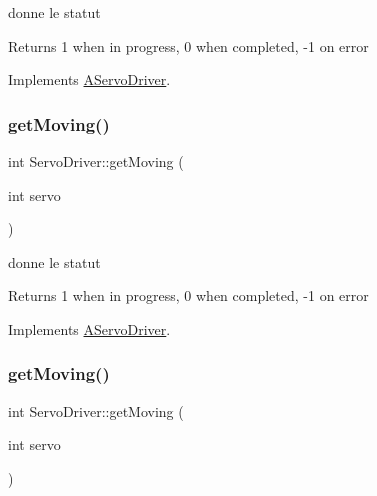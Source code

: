 donne le statut 

\begin{DoxyReturn}{Returns}
1 when in progress, 0 when completed, -\/1 on error 
\end{DoxyReturn}


Implements \hyperlink{classAServoDriver_a954ac7340407b997387d84d7059ed32b}{A\+Servo\+Driver}.

\mbox{\label{classServoDriver_a0a8e84f0bbcff39549ddfc239f1a6237}} 
\subsubsection{\texorpdfstring{get\+Moving()}{getMoving()}\hspace{0.1cm}{\footnotesize\ttfamily [2/6]}}
{\footnotesize\ttfamily int Servo\+Driver\+::get\+Moving (\begin{DoxyParamCaption}\item[{int}]{servo }\end{DoxyParamCaption})\hspace{0.3cm}{\ttfamily [virtual]}}



donne le statut 

\begin{DoxyReturn}{Returns}
1 when in progress, 0 when completed, -\/1 on error 
\end{DoxyReturn}


Implements \hyperlink{classAServoDriver_a954ac7340407b997387d84d7059ed32b}{A\+Servo\+Driver}.

\mbox{\label{classServoDriver_a0a8e84f0bbcff39549ddfc239f1a6237}} 
\subsubsection{\texorpdfstring{get\+Moving()}{getMoving()}\hspace{0.1cm}{\footnotesize\ttfamily [3/6]}}
{\footnotesize\ttfamily int Servo\+Driver\+::get\+Moving (\begin{DoxyParamCaption}\item[{int}]{servo }\end{DoxyParamCaption})\hspace{0.3cm}{\ttfamily [virtual]}}



